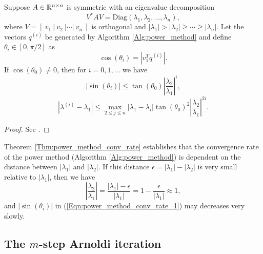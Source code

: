 \begin{theorem}			\label{Thm:power_method_conv_rate}
Suppose $A \in {\mathbb R}^{n \times n}$ is symmetric with an eigenvalue decomposition
\[
V^*AV = \text{Diag}(\lambda_1, \lambda_2, \ldots, \lambda_n),
\]
where $V = [\ v_1 \ | \ v_2 \ | \cdots | \ v_n \ ]$ is orthogonal and $|\lambda_1| > |\lambda_2| \geq \cdots \geq |\lambda_n|$.  Let the vectors $q^{(i)}$ be generated by Algorithm \ref{Alg:power_method} and define $\theta_i \in [0, \pi/2]$ as 
\[
	\cos(\theta_i) = \left| v_1^Tq^{(i)} \right|.
\]
If $\cos(\theta_0) \neq 0$, then for $i = 0, 1, \ldots$ we have 
\begin{equation} 		\label{Eqn:power_method_conv_rate_1}
\left| \sin(\theta_i) \right| \leq \tan(\theta_0) \left| \frac{\lambda_2}{\lambda_1} \right|^i,
\end{equation}
\begin{equation} 		\label{Eqn:power_method_conv_rate_2}
\left| \lambda^{(i)} - \lambda_1 \right| \leq \max_{2 \leq j \leq n} \left| \lambda_1 - \lambda_i \right| \tan(\theta_0)^2 \left| \frac{\lambda_2}{\lambda_1} \right|^{2i}.
\end{equation}
\end{theorem}

\begin{proof}
See \cite[Theorem 8.2.1]{golub2012matrix}.
\end{proof}

Theorem \ref{Thm:power_method_conv_rate} establishes that the convergence rate of the power method (Algorithm \ref{Alg:power_method}) is dependent on the distance between $|\lambda_1|$ and $|\lambda_2|$.  If this distance $\epsilon = |\lambda_1| - |\lambda_2|$ is very small relative to $|\lambda_1|$, then we have
\[
\left| \frac{\lambda_2}{\lambda_1} \right| = \frac{|\lambda_1| - \epsilon}{|\lambda_1|} = 1 - \frac{\epsilon}{|\lambda_1|} \approx 1,
\]
and $|\sin(\theta_i)|$ in (\ref{Eqn:power_method_conv_rate_1}) may decreases very slowly.  







\subsection{The $m$-step Arnoldi iteration} 			\label{Subsubsec:evol_mats-Arnoldi}


